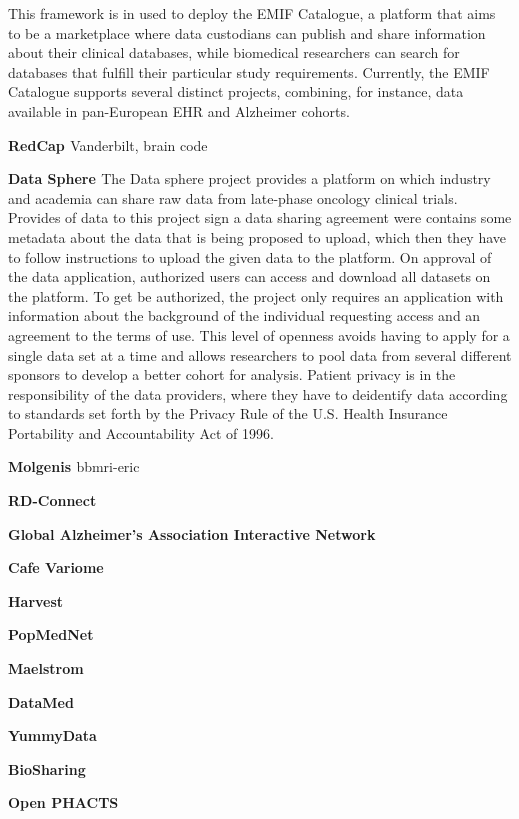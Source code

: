This framework is in used to deploy the EMIF Catalogue, a platform that aims to be a
marketplace where data custodians can publish and share information about their
clinical databases, while biomedical researchers can search for databases that fulfill
their particular study requirements. Currently, the EMIF Catalogue supports several
distinct projects, combining, for instance, data available in pan-European EHR and
Alzheimer cohorts.

\textbf{RedCap \cite{redcap}}
Vanderbilt, brain code

\textbf{Data Sphere \cite{datasphere}}
The Data sphere project provides a platform on which industry and academia can share
raw data from late-phase oncology clinical trials.
Provides of data to this project sign a data sharing agreement were contains some
metadata about the data that is being proposed to upload, which then they have to
follow instructions to upload the given data to the platform.
On approval of the data application, authorized users can access and download all
datasets on the platform.
To get be authorized, the project only requires an application with information about
the background of the individual requesting access and an agreement to the terms of
use.
This level of openness avoids having to apply for a single data set at a time and
allows researchers to pool data from several different sponsors to develop a better
cohort for analysis.
Patient privacy is in the responsibility of the data providers, where they have to
deidentify data according to standards set forth by the Privacy Rule of the U.S. Health
Insurance Portability and Accountability Act of 1996.

\textbf{Molgenis \cite{molgenis}}
bbmri-eric

\textbf{RD-Connect \cite{rdconnect}}

\textbf{Global Alzheimer's Association Interactive Network \cite{gaain}}

\textbf{Cafe Variome \cite{cafevariome}}

\textbf{Harvest \cite{harvest}}

\textbf{PopMedNet \cite{popmednet}}

\textbf{Maelstrom \cite{maelstrom}}

\textbf{DataMed \cite{datamed}}

\textbf{YummyData \cite{yummydata}}

\textbf{BioSharing \cite{biosharing}}

\textbf{Open PHACTS \cite{phacts}}

